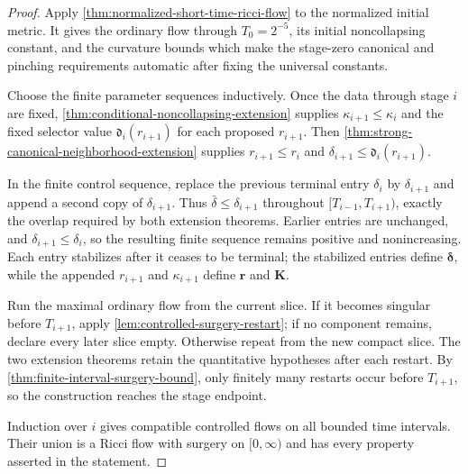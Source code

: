 \begin{proof}
Apply \ref{thm:normalized-short-time-ricci-flow} to the normalized initial
metric.  It gives the ordinary flow through $T_0=2^{-5}$, its initial
noncollapsing constant, and the curvature bounds which make the stage-zero
canonical and pinching requirements automatic after fixing the universal
constants.

Choose the finite parameter sequences inductively.  Once the data through
stage $i$ are fixed, \ref{thm:conditional-noncollapsing-extension} supplies
$\kappa_{i+1}\le\kappa_i$ and the fixed selector value
$\mathfrak d_i(r_{i+1})$ for each proposed $r_{i+1}$.  Then
\ref{thm:strong-canonical-neighborhood-extension} supplies
$r_{i+1}\le r_i$ and
$\delta_{i+1}\le\mathfrak d_i(r_{i+1})$.

In the finite control sequence, replace the previous terminal entry
$\delta_i$ by $\delta_{i+1}$ and append a second copy of
$\delta_{i+1}$.  Thus $\bar\delta\le\delta_{i+1}$ throughout
$[T_{i-1},T_{i+1})$, exactly the overlap required by both extension theorems.
Earlier entries are unchanged, and $\delta_{i+1}\le\delta_i$, so the resulting
finite sequence remains positive and nonincreasing.  Each entry stabilizes
after it ceases to be terminal; the stabilized entries define
$\boldsymbol\delta$, while the appended $r_{i+1}$ and $\kappa_{i+1}$ define
$\mathbf r$ and $\mathbf K$.

Run the maximal ordinary flow from the current slice.  If it becomes singular
before $T_{i+1}$, apply \ref{lem:controlled-surgery-restart}; if no component
remains, declare every later slice empty.  Otherwise repeat from the new
compact slice.  The two extension theorems retain the quantitative hypotheses
after each restart.  By \ref{thm:finite-interval-surgery-bound}, only finitely
many restarts occur before $T_{i+1}$, so the construction reaches the stage
endpoint.

Induction over $i$ gives compatible controlled flows on all bounded time
intervals.  Their union is a Ricci flow with surgery on $[0,\infty)$ and has
every property asserted in the statement.
\end{proof}
